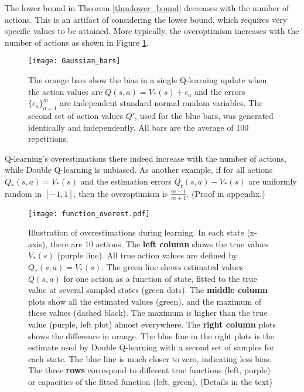 \documentclass[letterpaper]{article}
\begin{document}
The lower bound in Theorem \ref{thm:lower_bound} decreases with the number of actions. This is an artifact of considering the lower bound, which requires very specific values to be attained. More typically, the overoptimism increases with the number of actions as shown in Figure \ref{Gauss_bars}.
\begin{figure}[t]
\begin{center}
\texttt{[image: Gaussian\_bars]}
\caption{\label{Gauss_bars} The orange bars show the bias in a single Q-learning update when the action values are $Q(s,a) = V_*(s) + \epsilon_a$ and the errors $\{\epsilon_a\}_{a=1}^m$ are independent standard normal random variables.  The second set of action values $Q'$, used for the blue bars, was generated identically and independently.  All bars are the average of 100 repetitions.  }
\end{center}
\end{figure}
Q-learning's overestimations there indeed increase with the number of actions, while Double Q-learning is unbiased.
As another example, if for all actions $Q_*(s,a) = V_*(s)$ and the estimation errors $Q_t(s,a) - V_*(s)$ are uniformly random in $[-1,1]$, then the overoptimism is $\frac{m-1}{m+1}$. (Proof in appendix.)
\begin{figure*}[t]
\centering
\texttt{[image: function\_overest.pdf]}
\caption{\label{function_overest}
\small{
Illustration of overestimations during learning. In each state (x-axis), there are 10 actions. The \textbf{left column} shows the true values $V_*(s)$ (purple line). All true action values are defined by $Q_*(s,a) = V_*(s)$. The green line shows estimated values $Q(s,a)$ for one action as a function of state, fitted to the true value at several sampled states (green dots).
The \textbf{middle column} plots show all the estimated values (green), and the maximum of these values (dashed black). The maximum is higher than the true value (purple, left plot) almost everywhere. The \textbf{right column} plots shows the difference in orange. The blue line in the right plots is the estimate used by Double Q-learning with a second set of samples for each state. The blue line is much closer to zero, indicating less bias. The three \textbf{rows} correspond to different true functions (left, purple) or capacities of the fitted function (left, green). (Details in the text) 
}}
\end{figure*}
\end{document}
